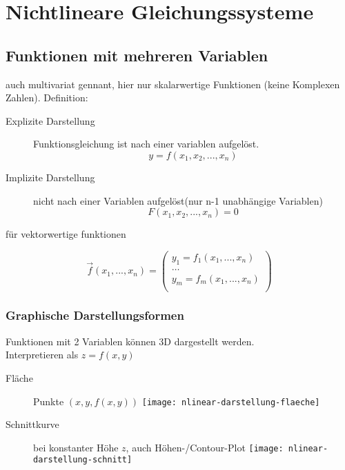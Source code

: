 \section{Nichtlineare Gleichungssysteme}

\subsection{Funktionen mit mehreren Variablen}

auch multivariat gennant, hier nur skalarwertige Funktionen (keine Komplexen Zahlen). Definition:
\begin{description}
	\item[Explizite Darstellung] Funktionsgleichung ist nach einer variablen aufgelöst.
		$$y = f(x_1, x_2, ...,x_n)$$
	\item[Implizite Darstellung] nicht nach einer Variablen aufgelöst(nur n-1
		unabhängige Variablen)
		$$F(x_1, x_2, ..., x_n) = 0$$
\end{description}

für vektorwertige funktionen

$$
	\vec{f}(x_1, ..., x_n) =
	\begin{pmatrix}
		y_1 = f_1(x_1, ..., x_n) \\
		\hdots                   \\
		y_m = f_m(x_1, ..., x_n) \\
	\end{pmatrix}
$$


\subsubsection{Graphische Darstellungsformen}
Funktionen mit 2 Variablen können 3D dargestellt werden. \\
Interpretieren als $z = f(x, y)$

\begin{multicols}{2}
	\begin{description}
		\item[Fläche] Punkte $(x, y, f(x,y))$
			\texttt{[image: nlinear-darstellung-flaeche]}
		\item[Schnittkurve] bei konstanter Höhe $z$, auch Höhen-/Contour-Plot
			\texttt{[image: nlinear-darstellung-schnitt]}
	\end{description}
\end{multicols}







